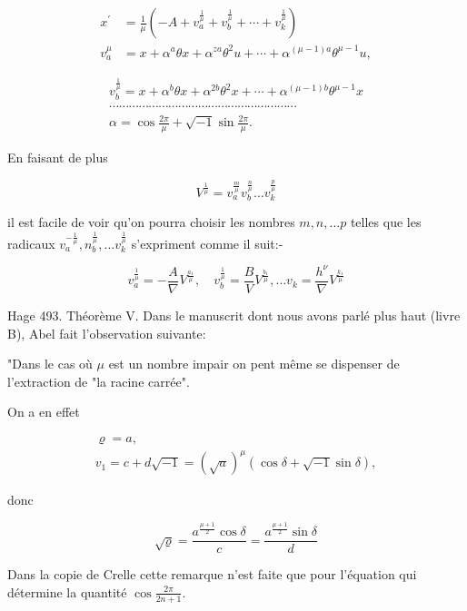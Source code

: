 \documentclass{article}
\begin{document}
\[
\begin{aligned}
x^{\prime} & =\frac{1}{\mu}\left(-A+v_{a}^{\frac{1}{\mu}}+v_{b}^{\frac{1}{\mu}}+\cdots+v_{k}^{\frac{1}{\mu}}\right) \\
v_{a}^{\mu} & =x+\alpha^{a} \theta x+\alpha^{z a} \theta^{2} u+\cdots+\alpha^{(\mu-1) a} \theta^{\mu-1} u,
\end{aligned}
\]

\[
\begin{gathered}
v_{b}^{\frac{1}{\mu}}=x+\alpha^{b} \theta x+\alpha^{2 b} \theta^{2} x+\cdots+\alpha^{(\mu-1) b} \theta^{\mu-1} x \\
\cdots \cdots \cdots \cdots \cdots \cdots \cdots \cdots \cdots \cdots \cdots \cdots \cdots \cdots \cdots \cdots \cdots \cdots \cdots \\
\alpha=\cos \frac{2 \pi}{\mu}+\sqrt{-1} \sin \frac{2 \pi}{\mu} .
\end{gathered}
\]

En faisant de plus

\[
V^{\frac{1}{\mu}}=v_{a}^{\frac{m}{\mu}} v_{b}^{\frac{n}{\mu}} \ldots v_{k}^{\frac{p}{\mu}}
\]

il est facile de voir qu'on pourra choisir les nombres \(m, n, \ldots p\) telles que les radicaux \(v_{a}^{-\frac{1}{\mu}}, n_{b}^{\frac{1}{\mu}}, \ldots v_{k}^{\frac{1}{\mu}}\) s'expriment comme il suit:-

\[
v_{a}^{\frac{1}{\mu}}=-\frac{A}{\nabla} V^{\frac{a_{1}}{\mu}}, \quad v_{b}^{\frac{1}{\mu}}=\frac{B}{V} V^{\frac{b_{1}}{\mu}}, \ldots v_{k}=\frac{h^{\nu}}{\nabla} V^{\frac{k_{1}}{\mu}}
\]

Hage 493. Théorème V. Dans le manuscrit dont nous avons parlé plus haut (livre B), Abel fait l'observation suivante:

"Dans le cas où \(\mu\) est un nombre impair on pent même se dispenser de l'extraction de "la racine carrée".

On a en effet

\[
\begin{gathered}
\varrho=a, \\
v_{1}=c+d \sqrt{-1}=(\sqrt{a})^{\mu}(\cos \delta+\sqrt{-1} \sin \delta),
\end{gathered}
\]

donc

\[
\sqrt{\varrho}=\frac{a^{\frac{\mu+1}{2}} \cos \delta}{c}=\frac{a^{\frac{\mu+1}{2}} \sin \delta}{d}
\]

Dans la copie de Crelle cette remarque n'est faite que pour l'équation qui détermine la quantité \(\cos \frac{2 \pi}{2 n+1}\).
\end{document}
